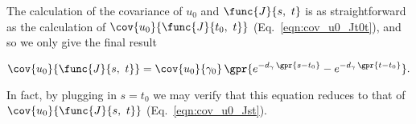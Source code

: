 The calculation of the covariance of $u_0$ and $\func{J}{s,\ t}$ is as straightforward as the calculation of $\cov{u_0}{\func{J}{t_0,\ t}}$ (Eq.~\ref{eqn:cov_u0_Jt0t}), and so we only give the final result

\begin{equation}
    \cov{u_0}{\func{J}{s,\ t}} = \cov{u_0}{\gamma_0}\,\gpr{e^{-d_{\gamma}\,\gpr{s - t_0}} - e^{-d_{\gamma}\,\gpr{t - t_0}}}. \label{eqn:cov_u0_Jst}
\end{equation}

In fact, by plugging in $s = t_0$ we may verify that this equation reduces to that of $\cov{u_0}{\func{J}{s,\ t}}$ (Eq.~\ref{eqn:cov_u0_Jst}).
